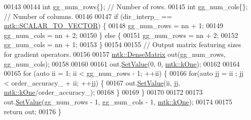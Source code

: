 \begin{DoxyCode}
00143 
00144   \textcolor{keywordtype}{int} gg\_num\_rows\{\};  \textcolor{comment}{// Number of rows.}
00145   \textcolor{keywordtype}{int} gg\_num\_cols\{\};  \textcolor{comment}{// Number of columns.}
00146 
00147   \textcolor{keywordflow}{if} (dir\_interp\_ == \hyperlink{namespacemtk_ga674ec67bd1baa04e5dc06c2bcc351972abc9e2b8cd5a497c9f3252a792e356139}{mtk::SCALAR\_TO\_VECTOR}) \{
00148     gg\_num\_rows = nn + 1;
00149     gg\_num\_cols = nn + 2;
00150   \} \textcolor{keywordflow}{else} \{
00151     gg\_num\_rows = nn + 2;
00152     gg\_num\_cols = nn + 1;
00153   \}
00154 
00155   \textcolor{comment}{// Output matrix featuring sizes for gradient operators.}
00156 
00157   \hyperlink{classmtk_1_1DenseMatrix}{mtk::DenseMatrix} out(gg\_num\_rows, gg\_num\_cols);
00158 
00160 
00161   out.\hyperlink{classmtk_1_1DenseMatrix_a784ce5784109ac86bfb9d8562b334b13}{SetValue}(0, 0, \hyperlink{group__c01-roots_ga26407c24d43b6b95480943340d285c71}{mtk::kOne});
00162 
00164 
00165   \textcolor{keywordflow}{for} (\textcolor{keyword}{auto} ii = 1; ii < gg\_num\_rows - 1; ++ii) \{
00166     \textcolor{keywordflow}{for}(\textcolor{keyword}{auto} jj = ii ; jj < order\_accuracy\_ + ii; ++jj) \{
00167       out.\hyperlink{classmtk_1_1DenseMatrix_a784ce5784109ac86bfb9d8562b334b13}{SetValue}(ii, jj, \hyperlink{group__c01-roots_ga26407c24d43b6b95480943340d285c71}{mtk::kOne}/order\_accuracy\_);
00168     \}
00169   \}
00170 
00172 
00173   out.\hyperlink{classmtk_1_1DenseMatrix_a784ce5784109ac86bfb9d8562b334b13}{SetValue}(gg\_num\_rows - 1, gg\_num\_cols - 1, \hyperlink{group__c01-roots_ga26407c24d43b6b95480943340d285c71}{mtk::kOne});
00174 
00175   \textcolor{keywordflow}{return} out;
00176 \}
\end{DoxyCode}
